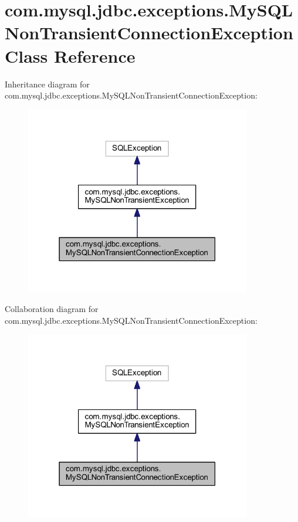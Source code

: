 \hypertarget{classcom_1_1mysql_1_1jdbc_1_1exceptions_1_1_my_s_q_l_non_transient_connection_exception}{}\section{com.\+mysql.\+jdbc.\+exceptions.\+My\+S\+Q\+L\+Non\+Transient\+Connection\+Exception Class Reference}
\label{classcom_1_1mysql_1_1jdbc_1_1exceptions_1_1_my_s_q_l_non_transient_connection_exception}


Inheritance diagram for com.\+mysql.\+jdbc.\+exceptions.\+My\+S\+Q\+L\+Non\+Transient\+Connection\+Exception\+:
\nopagebreak
\begin{figure}[H]
\begin{center}
\leavevmode
\includegraphics[width=279pt]{classcom_1_1mysql_1_1jdbc_1_1exceptions_1_1_my_s_q_l_non_transient_connection_exception__inherit__graph}
\end{center}
\end{figure}


Collaboration diagram for com.\+mysql.\+jdbc.\+exceptions.\+My\+S\+Q\+L\+Non\+Transient\+Connection\+Exception\+:
\nopagebreak
\begin{figure}[H]
\begin{center}
\leavevmode
\includegraphics[width=279pt]{classcom_1_1mysql_1_1jdbc_1_1exceptions_1_1_my_s_q_l_non_transient_connection_exception__coll__graph}
\end{center}
\end{figure}
